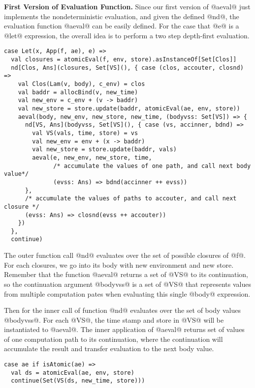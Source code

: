 \documentclass[acmsmall,review,anonymous]{acmart}\settopmatter{printfolios=true,printccs=false,printacmref=false}
\begin{document}
\textbf{First Version of Evaluation Function.}
Since our first version of @aeval@ just implements the nondeterministic
evaluation, and given the defined @nd@, the evaluation function @aeval@ can be easily
defined. For the case that @e@ is a @let@ expression,
the overall idea is to perform a two step depth-first evaluation. 

\begin{lstlisting}
case Let(x, App(f, ae), e) =>
  val closures = atomicEval(f, env, store).asInstanceOf[Set[Clos]]
  nd[Clos, Ans](closures, Set[VS](), { case (clos, accouter, closnd) =>
    val Clos(Lam(v, body), c_env) = clos
    val baddr = allocBind(v, new_time)
    val new_env = c_env + (v -> baddr)
    val new_store = store.update(baddr, atomicEval(ae, env, store))
    aeval(body, new_env, new_store, new_time, (bodyvss: Set[VS]) => {
      nd[VS, Ans](bodyvss, Set[VS](), { case (vs, accinner, bdnd) =>
        val VS(vals, time, store) = vs
        val new_env = env + (x -> baddr)
        val new_store = store.update(baddr, vals)
        aeval(e, new_env, new_store, time,
              /* accumulate the values of one path, and call next body value*/
              (evss: Ans) => bdnd(accinner ++ evss))
      },
      /* accumulate the values of paths to accouter, and call next closure */
      (evss: Ans) => closnd(evss ++ accouter))
    })
  },
  continue)
\end{lstlisting}

The outer function call @nd@ evaluates over the set of possible closures of
@f@. For each closures, we go into its body with new environment and new store.
Remember that the function @aeval@ returns a set of @VS@ to its continuation,
so the continuation argument @bodyvss@ is a set of @VS@ that represents values
from multiple computation pates when evaluating this single @body@ expression.

Then for the inner call of function @nd@ evaluates over the set of body values @bodyvss@.
For each @VS@, the time stamp and store in @VS@ will be instantiated to
@aeval@.
The inner application of @aeval@ returns set of values of one computation path to its
continuation, where the continuation will accumulate the result and transfer
evaluation to the next body value.

\begin{lstlisting}
case ae if isAtomic(ae) =>
  val ds = atomicEval(ae, env, store)
  continue(Set(VS(ds, new_time, store)))
\end{lstlisting}
\end{document}
